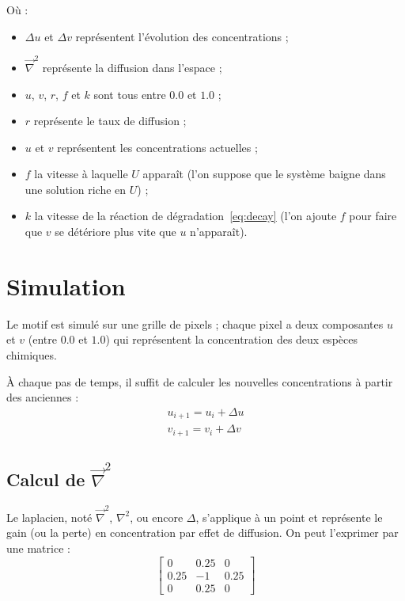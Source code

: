 \documentclass[11pt]{scrartcl}
\begin{document}
        Où :
        \begin{itemize}
            \setlength\itemsep{.05em}
            \item $\Delta u$ et $\Delta v$ représentent l'évolution des concentrations ;
            \item $\overrightarrow{\nabla}^2$ représente la diffusion dans l'espace ;
            \item $u$, $v$, $r$, $f$ et $k$ sont tous entre $0.0$ et $1.0$ ;
            \item $r$ représente le taux de diffusion ;
            \item $u$ et $v$ représentent les concentrations actuelles ;
            \item $f$ la vitesse à laquelle $U$ apparaît (l'on suppose que le système baigne dans une solution
                  riche en $U$) ;
            \item $k$ la vitesse de la réaction de
                  dégradation~\ref{eq:decay} (l'on ajoute $f$ pour faire que $v$ se
                  détériore plus vite que $u$ n'apparaît).
        \end{itemize}

    \section{Simulation}\label{sec:simulation}

        Le motif est simulé sur une grille de pixels ; chaque pixel a deux composantes $u$ et $v$ (entre $0.0$ et $1.0$)
        qui représentent la concentration des deux espèces chimiques.

        À chaque pas de temps, il suffit de calculer les nouvelles concentrations à partir des anciennes :
        \begin{gather*}
            u_{i + 1} = u_i + \Delta u \\
            v_{i + 1} = v_i + \Delta v
        \end{gather*}

        \subsection{Calcul de $\overrightarrow{\nabla}^2$}\label{subsec:laplace}

            Le laplacien, noté $\overrightarrow{\nabla}^2$, $\nabla^2$, ou encore $\Delta$, s'applique à
            un point et représente le gain (ou la perte) en concentration par effet de diffusion.
            On peut l'exprimer par une matrice :
            \[
                \begin{bmatrix}
                    0 & 0.25 & 0 \\
                    0.25 & -1 & 0.25 \\
                    0 & 0.25 & 0
                \end{bmatrix}
            \]
\end{document}
